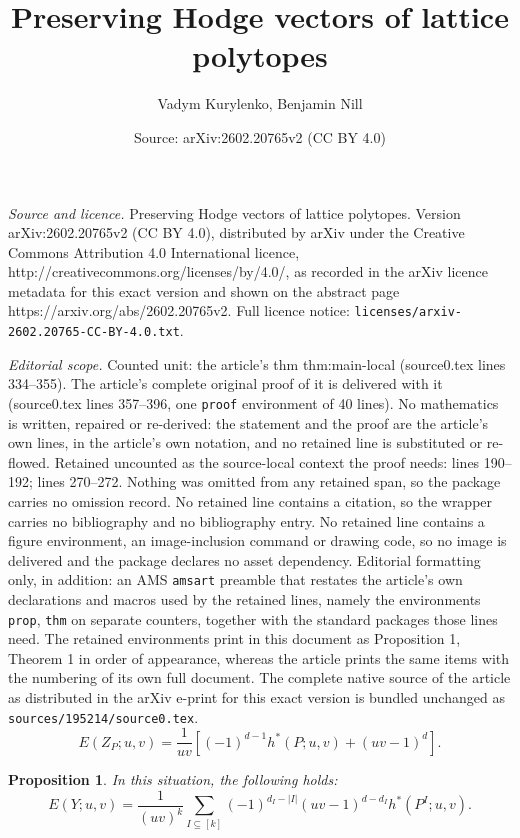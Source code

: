 \documentclass[10pt,a4paper]{amsart}
\title{Preserving Hodge vectors of lattice polytopes}
\author{Vadym Kurylenko, Benjamin Nill}
\date{Source: arXiv:2602.20765v2 (CC BY 4.0)}
\newtheorem{prop}{Proposition}
\newcommand{\abs}[1]{\left| #1 \right|}
\begin{document}
\maketitle

\noindent\emph{Source and licence.} Preserving Hodge vectors of lattice polytopes. Version arXiv:2602.20765v2 (CC BY 4.0), distributed by arXiv under the Creative Commons Attribution 4.0 International licence, http://creativecommons.org/licenses/by/4.0/, as recorded in the arXiv licence metadata for this exact version and shown on the abstract page https://arxiv.org/abs/2602.20765v2. Full licence notice: \texttt{licenses/arxiv-2602.20765-CC-BY-4.0.txt}.\par\smallskip

\noindent\textit{Editorial scope.} Counted unit: the article's thm thm:main-local (source0.tex lines 334--355). The article's complete original proof of it is delivered with it (source0.tex lines 357--396, one \texttt{proof} environment of 40 lines). No mathematics is written, repaired or re-derived: the statement and the proof are the article's own lines, in the article's own notation, and no retained line is substituted or re-flowed.  Retained uncounted as the source-local context the proof needs: lines 190--192; lines 270--272.  Nothing was omitted from any retained span, so the package carries no omission record.  No retained line contains a citation, so the wrapper carries no bibliography and no bibliography entry.  No retained line contains a figure environment, an image-inclusion command or drawing code, so no image is delivered and the package declares no asset dependency.  Editorial formatting only, in addition: an AMS \texttt{amsart} preamble that restates the article's own declarations and macros used by the retained lines, namely the environments \texttt{prop}, \texttt{thm} on separate counters, together with the standard packages those lines need.  The retained environments print in this document as Proposition 1, Theorem 1 in order of appearance, whereas the article prints the same items with the numbering of its own full document.  The complete native source of the article as distributed in the arXiv e-print for this exact version is bundled unchanged as \texttt{sources/195214/source0.tex}.
\begin{equation}  E(Z_P; u,v) = \frac{1}{uv} \left[(-1)^{d-1} h^*(P; u,v) + (uv- 1)^{d} \right].
\label{E-hyper}
\end{equation}

 \begin{prop} \label{prop: mixed_h_relation} In this situation, the following holds:
   \[ E (Y; u,v) =\frac{1}{(uv)^k} \sum_{I \subseteq[k]} (-1)^{d_I -\abs{I}} (uv-1)^{d-d_I} h^*(P^I; u,v).\]  
\end{prop}
\end{document}
